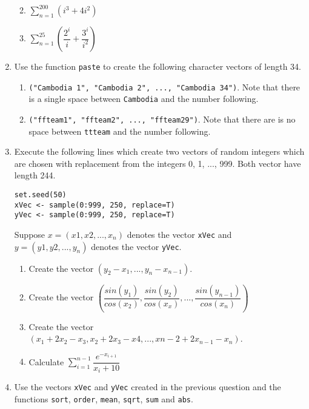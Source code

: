 \documentclass[11pt,a4paper]{article}
\begin{document}
\begin{enumerate}
	\begin{multicols}{2}
		\begin{enumerate}
			\everymath{\displaystyle}  
			\item $\sum_{n=1}^{200}(i^{3}+4i^{2})$
			\item $\sum_{n=1}^{25}(\dfrac{2^{i}}{i} + \dfrac{3^{i}}{i^{2}})$ 
		\end{enumerate}
	\end{multicols}
	
	\item Use the function \texttt{paste} to create the following character vectors of length 34. 
	\begin{enumerate}
		\item \texttt{("Cambodia 1", "Cambodia 2", ..., "Cambodia 34")}. Note that there is a single space between \texttt{Cambodia} and the number following. 
		\item \texttt{("ffteam1", "ffteam2", ..., "ffteam29")}. Note that there are is no space between \texttt{ttteam} and the number following.  
	\end{enumerate}

	\item Execute the following lines which create two vectors of random integers which are chosen with replacement from the integers 0, 1, ..., 999. Both vector have length 244. 
	
	\texttt{set.seed(50) \\
	xVec <- sample(0:999, 250, replace=T)\\
	yVec <- sample(0:999, 250, replace=T)}

	Suppose $x = (x1, x2, ..., x_{n})$ denotes the vector \texttt{xVec} and $y = (y1, y2, ..., y_{n})$ denotes the vector \texttt{yVec}.
	
	\begin{enumerate}
		\item Create the vector $(y_{2}-x_{1}, ..., y_{n}-x_{n-1})$. 
		\item Create the vector $(\dfrac{sin(y_{1})}{cos(x_{2})}, \dfrac{sin(y_{2})}{cos(x_{x})}, ..., \dfrac{sin(y_{n-1})}{cos(x_{n})})$
		\item Create the vector $(x_{1} + 2x_{2} - x_{3}, x_{2} + 2x_{3} - x{4}, ..., x{n-2} +2x_{n-1} - x_{n})$. 
		\everymath{\displaystyle}  
		\item Calculate $\sum_{i=1}^{n-1} \dfrac{e^{-x_{i+1}}}{x_{i} + 10}$
	\end{enumerate}

	\item Use the vectors \texttt{xVec} and \texttt{yVec} created in the previous question and the functions \texttt{sort}, \texttt{order}, \texttt{mean}, \texttt{sqrt}, \texttt{sum} and \texttt{abs}. 
	

\end{enumerate}
\end{document}
